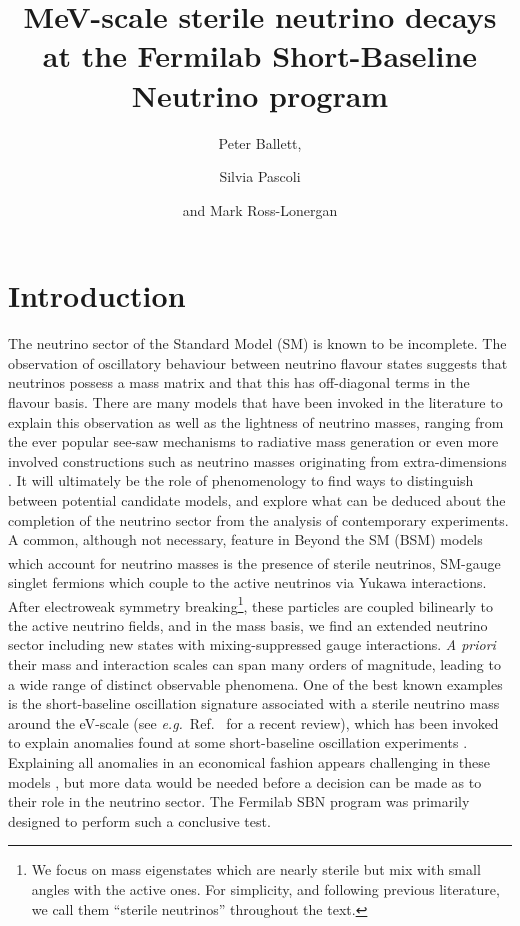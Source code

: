 \documentclass[11pt, a4paper]{article}
\title{MeV-scale sterile neutrino decays at the Fermilab Short-Baseline Neutrino program}
\author{Peter Ballett,}
\author{Silvia Pascoli}
\author{and Mark Ross-Lonergan}
\affiliation{Institute for Particle Physics Phenomenology, Department of
Physics, Durham University, South Road, Durham DH1 3LE, United Kingdom}
\newcommand{\refref}[1]{Ref.~\cite{#1}}
\def\eg{\emph{e.g.}}
\newcounter{CommentCount}
\newcommand{\marcom}[2]{\textsuperscript{\textcolor{#1}{\theCommentCount}}\marginpar{\textsuperscript{\textcolor{#1}{\theCommentCount}}\textcolor{#1}{{\small#1: #2}}}\stepcounter{CommentCount}}
\begin{document}
 

\maketitle

\section{Introduction}

The neutrino sector of the Standard Model (SM) is known to be incomplete. The
observation of oscillatory behaviour between neutrino flavour states
\cite{Fukuda:1998mi} suggests that neutrinos possess a mass matrix and that
this has off-diagonal terms in the flavour basis. There are many models that
have been invoked in the literature to explain this observation as well as the
lightness of neutrino masses, ranging from the ever popular see-saw mechanisms
\cite{Minkowski:1977sc, GellMann:1980vs, Mohapatra:1979ia} to radiative mass
generation \cite{Zee:1980ai,Babu:1988ki} or even more involved constructions
such as neutrino masses originating from extra-dimensions
\cite{ArkaniHamed:1998vp}.  It will ultimately be the role of phenomenology to
find ways to distinguish between potential candidate models, and explore what
can be deduced about the completion of the neutrino sector from the analysis of
contemporary experiments.
%
%
A common, although not necessary, feature in Beyond the SM (BSM) models which
account\marcom{PB}{I rolled back account/accounts.} for neutrino masses is the
presence of sterile neutrinos, SM-gauge singlet fermions which couple to the
active neutrinos via Yukawa interactions.  After electroweak symmetry
breaking\footnote{We focus on mass eigenstates which are nearly sterile but mix
with small angles with the active ones. For simplicity, and following previous
literature, we call them ``sterile neutrinos'' throughout the text.}, these
particles are coupled bilinearly to the active neutrino fields, and in the mass
basis, we find an extended neutrino sector including new states with
mixing-suppressed gauge interactions. \emph{A priori} their mass and
interaction scales can span many orders of magnitude, leading to a wide range
of distinct observable phenomena.
%
One of the best known examples is the short-baseline oscillation signature
associated with a sterile neutrino mass around the eV-scale (see \eg\
\refref{Gariazzo:2015rra} for a recent review), which has been invoked to
explain anomalies found at some short-baseline oscillation experiments
\cite{Aguilar:2001ty, Aguilar-Arevalo:2013pmq, AguilarArevalo:2008rc}.
Explaining all anomalies in an economical fashion appears challenging in these
models \cite{Kopp:2013vaa,Conrad:2012qt}, but more data would be needed before
a decision can be made as to their role in the neutrino sector. The Fermilab
SBN \cite{Antonello:2015lea} program was primarily designed to perform such a
conclusive test.
\end{document}
